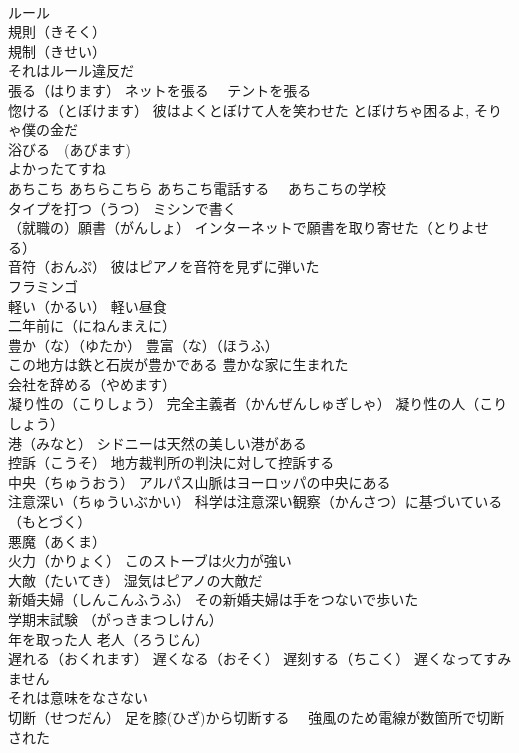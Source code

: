 \documentclass[8pt]{extreport}
\begin{document}
\begin{CJK}{UTF8}{min}
\\	ルール 
\\	規則（きそく）
\\	規制（きせい）
\\	それはルール違反だ
\\	張る（はります） ネットを張る　 テントを張る
\\	惚ける（とぼけます） 彼はよくとぼけて人を笑わせた とぼけちゃ困るよ, そりゃ僕の金だ
\\	浴びる　(あびます)
\\	よかったてすね
\\	あちこち あちらこちら あちこち電話する　 あちこちの学校
\\	タイプを打つ（うつ） ミシンで書く
\\	（就職の）願書（がんしょ） インターネットで願書を取り寄せた（とりよせる）
\\	音符（おんぷ） 彼はピアノを音符を見ずに弾いた
\\	フラミンゴ
\\	軽い（かるい） 軽い昼食
\\	二年前に（にねんまえに）
\\	豊か（な）（ゆたか） 豊富（な）（ほうふ）
\\	この地方は鉄と石炭が豊かである 豊かな家に生まれた
\\	会社を辞める（やめます）
\\	凝り性の（こりしょう） 完全主義者（かんぜんしゅぎしゃ） 凝り性の人（こりしょう）
\\	港（みなと） シドニーは天然の美しい港がある
\\	控訴（こうそ） 地方裁判所の判決に対して控訴する
\\	中央（ちゅうおう） アルパス山脈はヨーロッパの中央にある
\\	注意深い（ちゅういぶかい） 科学は注意深い観察（かんさつ）に基づいている（もとづく）
\\	悪魔（あくま）
\\	火力（かりょく） このストーブは火力が強い
\\	大敵（たいてき） 湿気はピアノの大敵だ
\\	新婚夫婦（しんこんふうふ） その新婚夫婦は手をつないで歩いた
\\	学期末試験 （がっきまつしけん）
\\	年を取った人 老人（ろうじん）
\\	遅れる（おくれます） 遅くなる（おそく） 遅刻する（ちこく） 遅くなってすみません
\\	それは意味をなさない
\\	切断（せつだん） 足を膝(ひざ)から切断する　 強風のため電線が数箇所で切断された

\end{CJK}
\end{document}
